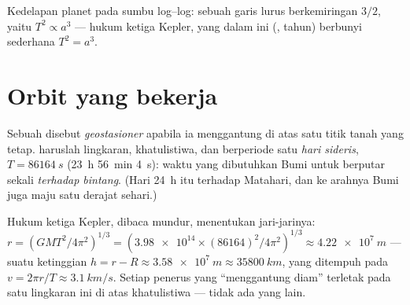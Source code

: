 \begin{omfigure}

{\small Kedelapan planet pada sumbu log--log: sebuah garis lurus berkemiringan
$3/2$, yaitu $T^2 \propto a^3$ --- hukum ketiga Kepler, yang dalam  ini
(, tahun) berbunyi sederhana $T^2 = a^3$.}
\end{omfigure}

\section{Orbit yang bekerja}

\begin{definition}\label{def:g12:satellites-kepler:geo}
Sebuah  disebut \emph{geostasioner} apabila
ia menggantung di atas satu titik tanah yang tetap.  haruslah
lingkaran, khatulistiwa, dan berperiode satu \emph{hari
sideris}, $T = \qty{86164}{s}$ (\qty{23}{h}
\qty{56}{min} \qty{4}{s}): waktu yang dibutuhkan Bumi untuk berputar sekali
\emph{terhadap bintang}. (Hari \qty{24}{h} itu terhadap Matahari, dan ke
arahnya Bumi juga maju satu derajat sehari.)
\end{definition}

\begin{example}\label{ex:g12:satellites-kepler:geoalt}
Hukum ketiga Kepler, dibaca mundur, menentukan jari-jarinya:
$r = \left(GMT^2/4\pi^2\right)^{1/3} =
\left(\num{3.98e14} \times (\num{86164})^2/4\pi^2\right)^{1/3}
\approx \qty{4.22e7}{m}$ --- suatu ketinggian $h = r - R \approx
\qty{3.58e7}{m} \approx \qty{35800}{km}$, yang ditempuh pada $v = 2\pi r/T
\approx \qty{3.1}{km/s}$. Setiap penerus  yang ``menggantung diam''
terletak pada satu lingkaran ini di atas khatulistiwa --- tidak ada yang lain.
\end{example}

